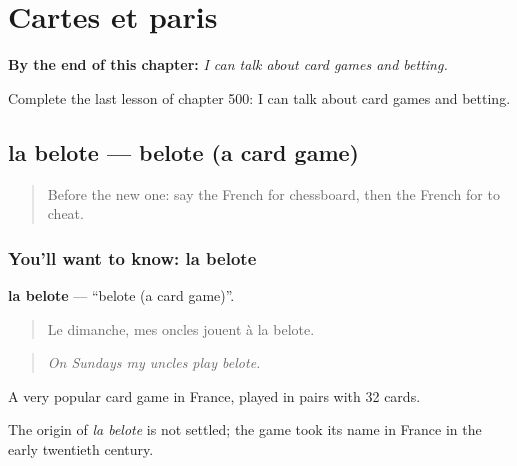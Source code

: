 
\chapter{Cartes et paris}
\label{ch:fr-cartes-et-paris}

\begin{chapteropening}
\textbf{By the end of this chapter:} \emph{I can talk about card games and betting.}

Complete the last lesson of chapter 500: I can talk about card games and betting.
\end{chapteropening}

\section[la belote]{la belote — belote (a card game)}

\label{lesson:FR-C500-belote}



\begin{quote}
Before the new one: say the French for chessboard, then the French for to cheat.
\end{quote}

\subsection*{You'll want to know: la belote}
\textbf{la belote} — \textquotedblleft{}belote (a card game)\textquotedblright{}.

\begin{quote}
Le dimanche, mes oncles jouent à la belote.
\end{quote}

\begin{quote}
\emph{On Sundays my uncles play belote.}
\end{quote}

A very popular card game in France, played in pairs with 32 cards.

\begin{cousinweb}
The origin of \emph{la belote} is not settled; the game took its name in France in the early twentieth century.
\end{cousinweb}

